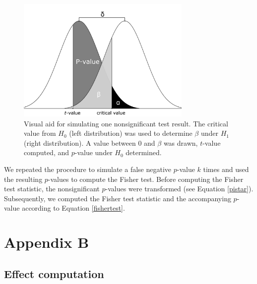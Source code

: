 \documentclass{article}
\begin{document}
\begin{figure}[!ht]
\centering
\includegraphics[width=0.75\textwidth]{../figures/appendix_a}
\caption{Visual aid for simulating one nonsignificant test result. The critical value from $H_0$ (left distribution) was used to determine $\beta$ under $H_1$ (right distribution). A value between 0 and $\beta$ was drawn, $t$-value computed, and $p$-value under $H_0$ determined.}
\label{fig:appendixa}
\end{figure}

We repeated the procedure to simulate a false negative $p$-value $k$ times and used the resulting $p$-values to compute the Fisher test. Before computing the Fisher test statistic, the nonsignificant $p$-values were transformed (see Equation \ref{pistar}). Subsequently, we computed the Fisher test statistic and the accompanying $p$-value according to Equation \ref{fishertest}. 

\section*{Appendix B}
\subsection*{Effect computation}
\end{document}
